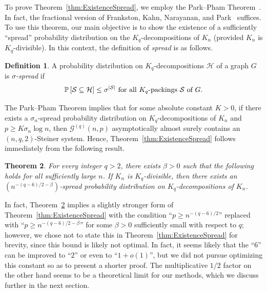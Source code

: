 \documentclass[11pt]{article}
\numberwithin{equation}{section}
\newcounter{i}
\theoremstyle{plain}
\newtheorem{thm}{Theorem}[section]
\theoremstyle{plain} %
\theoremstyle{definition}
\newtheorem{definition}[thm]{Definition}
\newcommand{\cS}{\mathcal{S}}
\newcommand{\cH}{\mathcal{H}}
\newcommand{\cG}{\mathcal{G}}
\newcommand{\Prob}[1]{\ensuremath{%
\mathbb P\left[#1\right]
}}
\begin{document}
To prove Theorem~\ref{thm:ExistenceSpread}, we employ the Park--Pham Theorem~\cite{PP23}.  In fact, the fractional version of Frankston, Kahn, Narayanan, and Park~\cite{FKNP21} suffices.  To use this theorem, our main objective is to show the existence of a sufficiently ``spread'' probability distribution on the $K_q$-decompositions of $K_n$ (provided $K_n$ is $K_q$-divisible). In this context, the definition of \textit{spread} is as follows.

\begin{definition}
    A probability distribution on $K_q$-decompositions $\cH$ of a graph $G$ is \textit{$\sigma$-spread} if
    \begin{equation*}
        \Prob{\cS \subseteq \cH} \leq \sigma^{|\cS|} \text{ for all $K_q$-packings $\cS$ of $G$.} 
    \end{equation*}
\end{definition}

The Park--Pham Theorem implies that for some absolute constant $K > 0$, if there exists a $\sigma_n$-spread probability distribution on $K_q$-decompositions of $K_n$ and $p \geq K\sigma_n\log n$, then $\cG^{(q)}(n, p)$ asymptotically almost surely contains an $(n, q, 2)$-Steiner system.  Hence, Theorem~\ref{thm:ExistenceSpread} follows immediately from the following result.

\begin{thm}\label{thm:spread-decomposition}
  For every integer $q > 2$, there exists $\beta > 0$ such that the following holds for all sufficiently large $n$.  If $K_n$ is $K_q$-divisible, then there exists an $\left(n^{-(q - 6)/2 - \beta}\right)$-spread probability distribution on $K_q$-decompositions of $K_n$.
\end{thm}

In fact, Theorem~\ref{thm:spread-decomposition} implies a slightly stronger form of Theorem~\ref{thm:ExistenceSpread} with the condition ``$p \geq n^{-(q-6)/2}$'' replaced with ``$p \geq n^{-(q - 6)/2 - \beta}$'' for some $\beta > 0$ sufficiently small with respect to $q$; however, we chose not to state this in Theorem~\ref{thm:ExistenceSpread} for brevity, since this bound is likely not optimal.  In fact, it seems likely that the ``$6$'' can be improved to ``$2$'' or even to ``$1 + o(1)$'', but we did not pursue optimizing this constant so as to present a shorter proof.  The multiplicative $1/2$ factor on the other hand seems to be a theoretical limit for our methods, which we discuss further in the next section.
\end{document}
